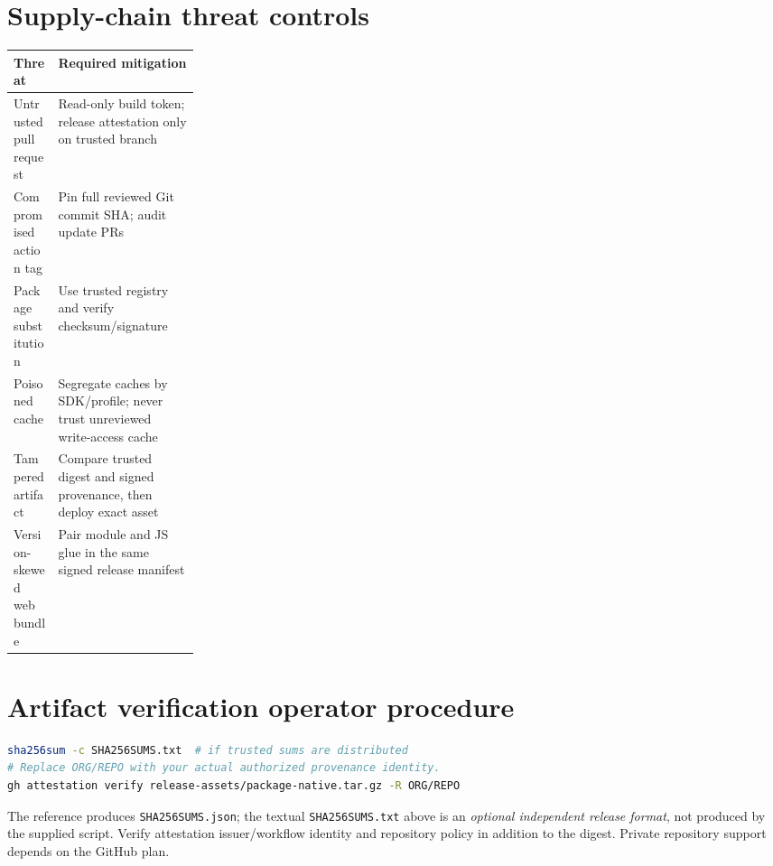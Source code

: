 \documentclass[11pt,letterpaper]{article}
\begin{document}
\section{Supply-chain threat controls}
\noindent\begin{tabularx}{\linewidth}{p{0.24\linewidth}X}
\toprule Threat & Required mitigation \\ \midrule
Untrusted pull request & Read-only build token; release attestation only on trusted branch \\
Compromised action tag & Pin full reviewed Git commit SHA; audit update PRs \\
Package substitution & Use trusted registry and verify checksum/signature \\
Poisoned cache & Segregate caches by SDK/profile; never trust unreviewed write-access cache \\
Tampered artifact & Compare trusted digest and signed provenance, then deploy exact asset \\
Version-skewed web bundle & Pair module and JS glue in the same signed release manifest \\
\bottomrule
\end{tabularx}

\section{Artifact verification operator procedure}
\begin{lstlisting}[language=bash,caption={Illustrative post-download checks}]
sha256sum -c SHA256SUMS.txt  # if trusted sums are distributed
# Replace ORG/REPO with your actual authorized provenance identity.
gh attestation verify release-assets/package-native.tar.gz -R ORG/REPO
\end{lstlisting}
The reference produces \texttt{SHA256SUMS.json}; the textual \texttt{SHA256SUMS.txt} above is an \emph{optional independent release format}, not produced by the supplied script. Verify attestation issuer/workflow identity and repository policy in addition to the digest. Private repository support depends on the GitHub plan.
\end{document}
